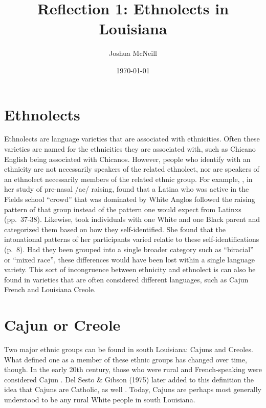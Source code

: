 \documentclass{article}
\title{Reflection 1: Ethnolects in Louisiana}
\author{Joshua McNeill}
\date{\today}
\begin{document}
  \maketitle
  \doublespacing
  \section{Ethnolects}
    Ethnolects are language varieties that are associated with ethnicities.
    Often these varieties are named for the ethnicities they are associated with, such as Chicano English being associated with Chicanos.
    However, people who identify with an ethnicity are not necessarily speakers of the related ethnolect, nor are speakers of an ethnolect necessarily members of the related ethnic group.
    For example, \textcite{eckert_where_2008}, in her study of pre-nasal /ae/ raising, found that a Latina who was active in the Fields school ``crowd'' that was dominated by White Anglos followed the raising pattern of that group instead of the pattern one would expect from Latinxs (pp.~37-38).
    Likewise, \textcite{holliday_multiracial_2019} took individuals with one White and one Black parent and categorized them based on how they self-identified.
    She found that the intonational patterns of her participants varied relatie to these self-identifications (p.~8).
    Had they been grouped into a single broader category such as ``biracial'' or ``mixed race'', these differences would have been lost within a single language variety.
    This sort of incongruence between ethnicity and ethnolect is can also be found in varieties that are often considered different languages, such as Cajun French and Louisiana Creole.

  \section{Cajun or Creole}
    Two major ethnic groups can be found in south Louisiana: Cajuns and Creoles.
    What defined one as a member of these ethnic groups has changed over time, though.
    In the early 20th century, those who were rural and French-speaking were considered Cajun \parencite[p.~198]{smith_influence_1939}.
    Del Sesto \& Gibson (1975) later added to this definition the idea that Cajuns are Catholic, as well \parencite[as cited in][p.~15]{neumann_creole_1985}.
    Today, Cajuns are perhaps most generally understood to be any rural White people in south Louisiana.
\end{document}
